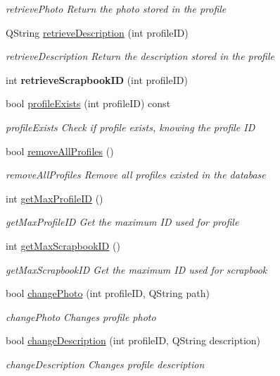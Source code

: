 \begin{DoxyCompactItemize}
\begin{DoxyCompactList}\small\item\em retrieve\+Photo Return the photo stored in the profile \end{DoxyCompactList}\item 
Q\+String \hyperlink{classProfileDB_a139f1f03f7ee3550fc904af779fa0a2a}{retrieve\+Description} (int profile\+ID)
\begin{DoxyCompactList}\small\item\em retrieve\+Description Return the description stored in the profile \end{DoxyCompactList}\item 
int {\bfseries retrieve\+Scrapbook\+ID} (int profile\+ID)\hypertarget{classProfileDB_a11982c294c69edd4c4e279c94b568557}{}\label{classProfileDB_a11982c294c69edd4c4e279c94b568557}

\item 
bool \hyperlink{classProfileDB_a17867d77854426b37e473c00de6acdfb}{profile\+Exists} (int profile\+ID) const 
\begin{DoxyCompactList}\small\item\em profile\+Exists Check if profile exists, knowing the profile ID \end{DoxyCompactList}\item 
bool \hyperlink{classProfileDB_a4971bdc09df2a7925cc8c29951d1fecd}{remove\+All\+Profiles} ()
\begin{DoxyCompactList}\small\item\em remove\+All\+Profiles Remove all profiles existed in the database \end{DoxyCompactList}\item 
int \hyperlink{classProfileDB_a667a97763757c2ca399c9b617d172f22}{get\+Max\+Profile\+ID} ()
\begin{DoxyCompactList}\small\item\em get\+Max\+Profile\+ID Get the maximum ID used for profile \end{DoxyCompactList}\item 
int \hyperlink{classProfileDB_a4a6537f590fcf08f4072fb1898679ddb}{get\+Max\+Scrapbook\+ID} ()
\begin{DoxyCompactList}\small\item\em get\+Max\+Scrapbook\+ID Get the maximum ID used for scrapbook \end{DoxyCompactList}\item 
bool \hyperlink{classProfileDB_a4f2c1567a44455f4e24937380631fdee}{change\+Photo} (int profile\+ID, Q\+String path)
\begin{DoxyCompactList}\small\item\em change\+Photo Changes profile photo \end{DoxyCompactList}\item 
bool \hyperlink{classProfileDB_aa91bf52b637d81374f7a1ca5c3cf3dc7}{change\+Description} (int profile\+ID, Q\+String description)
\begin{DoxyCompactList}\small\item\em change\+Description Changes profile description \end{DoxyCompactList}\end{DoxyCompactItemize}


